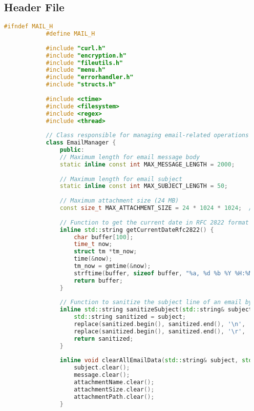 \documentclass{article}
\begin{document}
	\subsection*{Header File}
	\begin{mdframed}[backgroundcolor=background, hidealllines=false, innerleftmargin=15pt, innerrightmargin=5pt, innertopmargin=0pt, innerbottommargin=-5pt, linecolor=accent]
		\begin{lstlisting}[language=C++]
			#ifndef MAIL_H
			#define MAIL_H
			
			#include "curl.h"
			#include "encryption.h"
			#include "fileutils.h"
			#include "menu.h"
			#include "errorhandler.h"
			#include "structs.h"
			
			#include <ctime>
			#include <filesystem>
			#include <regex>
			#include <thread>
			
			// Class responsible for managing email-related operations
			class EmailManager {
				public:
				// Maximum length for email message body
				static inline const int MAX_MESSAGE_LENGTH = 2000;
				
				// Maximum length for email subject
				static inline const int MAX_SUBJECT_LENGTH = 50;
				
				// Maximum attachment size (24 MB)
				const size_t MAX_ATTACHMENT_SIZE = 24 * 1024 * 1024;  // 24 MB in bytes
				
				// Function to get the current date in RFC 2822 format
				inline std::string getCurrentDateRfc2822() {
					char buffer[100];
					time_t now;
					struct tm *tm_now;
					time(&now);
					tm_now = gmtime(&now);
					strftime(buffer, sizeof buffer, "%a, %d %b %Y %H:%M:%S %Z", tm_now);
					return buffer;
				}
				
				// Function to sanitize the subject line of an email by replacing newline and carriage return characters with spaces
				inline std::string sanitizeSubject(std::string& subject) {
					std::string sanitized = subject;
					replace(sanitized.begin(), sanitized.end(), '\n', ' '); // replace newlines with spaces
					replace(sanitized.begin(), sanitized.end(), '\r', ' '); // replace carriage returns with spaces
					return sanitized;
				}
				
				inline void clearAllEmailData(std::string& subject, std::string& message, std::string& attachmentName, std::string& attachmentSize, std::string& attachmentPath) {
					subject.clear();
					message.clear();
					attachmentName.clear();
					attachmentSize.clear();
					attachmentPath.clear();
				}
				

\end{lstlisting}
\end{mdframed}
\end{document}
